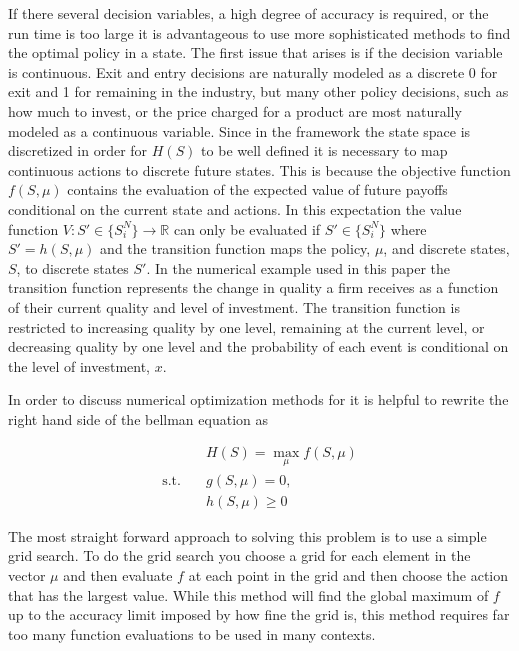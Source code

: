 \documentclass[12pt]{article}
\begin{document}
If there several decision variables, a high degree of accuracy is required, or the run time is too large it is advantageous to use more sophisticated methods to find the optimal policy in a state. The first issue that arises is if the decision variable is continuous. Exit and entry decisions are naturally modeled as a discrete 0 for exit and 1 for remaining in the industry, but many other policy decisions, such as how much to invest, or the price charged for a product are most naturally modeled as a continuous variable. Since in the \citet{1995_Erickson_Pakes_RES} framework the state space is discretized in order for $H(S)$ to be well defined it is necessary to map continuous actions to discrete future states. This is because the objective function $f(S,\mu)$ contains the evaluation of the expected value of future payoffs conditional on the current state and actions. In this expectation the value function $V : S' \in \{S_i^N\} \rightarrow \mathbb{R}$ can only be evaluated if $S' \in \{S_i^N\}$ where $S'=h(S,\mu)$ and the transition function maps the policy, $\mu$, and discrete states, $S$, to discrete states $S'$. In the numerical example used in this paper the transition function represents the change in quality a firm receives as a function of their current quality and level of investment. The transition function is restricted to increasing quality by one level, remaining at the current level, or decreasing quality by one level and the probability of each event is conditional on the level of investment, $x$.

In order to discuss numerical optimization methods for it is helpful to rewrite the right hand side of the bellman equation as

\begin{equation}
  \label{hdef}
  \begin{aligned}
    & H(S)=\max_{\mu} f(S,\mu) \\
    \text{s.t.}\quad & g(S, \mu)=0,\\
    & h(S,\mu) \geq 0
  \end{aligned}
\end{equation}

The most straight forward approach to solving this problem is to use a simple grid search. To do the grid search you choose a grid for each element in the vector $\mu$ and then evaluate $f$ at each point in the grid and then choose the action that has the largest value. While this method will find the global maximum of $f$ up to the accuracy limit imposed by how fine the grid is, this method requires far too many function evaluations to be used in many contexts.
\end{document}
